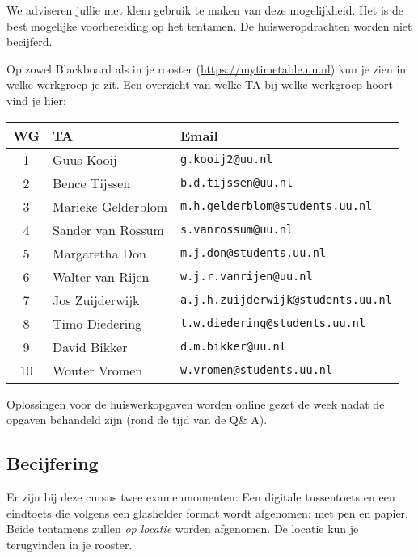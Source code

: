 We adviseren jullie met klem gebruik te maken van deze mogelijkheid.
Het is de best mogelijke voorbereiding op het tentamen. De huisweropdrachten worden niet becijferd.


Op zowel Blackboard als in je rooster (\url{https://mytimetable.uu.nl}) kun je zien in welke werkgroep je zit.
Een overzicht van welke TA bij welke werkgroep hoort vind je hier:
\begin{center}
\begin{tabular}{| c | l | l |}
\hline
  \textbf{WG} & \textbf{TA} & \textbf{Email}\\\hline
  1& Guus Kooij & \texttt{g.kooij2@uu.nl}\\
  2 & Bence Tijssen & \texttt{b.d.tijssen@uu.nl}\\
  3& Marieke Gelderblom& \texttt{m.h.gelderblom@students.uu.nl}\\
  4 & Sander van Rossum & \texttt{s.vanrossum@uu.nl}\\
  5 & Margaretha Don & \texttt{m.j.don@students.uu.nl}\\
  6 & Walter van Rijen & \texttt{w.j.r.vanrijen@uu.nl}\\
  7& Jos Zuijderwijk & \texttt{a.j.h.zuijderwijk@students.uu.nl}\\
  8 & Timo Diedering & \texttt{t.w.diedering@students.uu.nl}\\
  9 & David Bikker & \texttt{d.m.bikker@uu.nl}\\
  10& Wouter Vromen & \texttt{w.vromen@students.uu.nl}\\\hline
\end{tabular}
\end{center}

Oplossingen voor de huiswerkopgaven worden online gezet de week nadat de opgaven behandeld zijn (rond de tijd van de Q\& A). 

\subsection*{Becijfering}

Er zijn bij deze cursus twee examenmomenten:
Een digitale tussentoets en een eindtoets die volgens een glashelder format wordt afgenomen: met pen en papier. Beide tentamens zullen \emph{op locatie} worden afgenomen. De locatie kun je terugvinden in je rooster.


